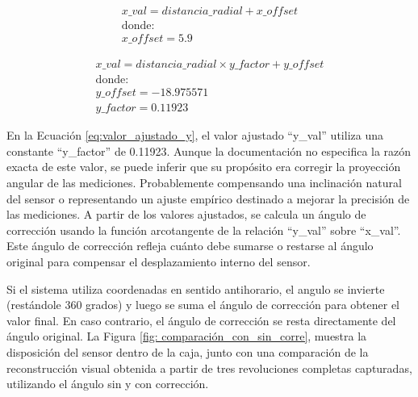 \begin{center}
	\begin{equation}
		\label{eq:valor_ajustado_x}
		\begin{array}{c}
			x\_val = distancia\_radial + x\_offset \\
			\text{donde:} \\
			x\_offset = 5.9
		\end{array}
	\end{equation}
\end{center}

\begin{center}
	\begin{equation}
		\label{eq:valor_ajustado_y}
		\begin{array}{c}
			x\_val = distancia\_radial \times y\_factor + y\_offset \\
			\text{donde:} \\
			y\_offset = -18.975571 \\
			y\_factor = 0.11923
		\end{array}
	\end{equation}
\end{center}

En la Ecuación \ref{eq:valor_ajustado_y}, el valor ajustado ``y\_val'' utiliza una constante  ``y\_factor'' de 0.11923. Aunque la documentación no especifica la razón exacta de este valor, se puede inferir que su propósito era corregir la proyección angular de las mediciones. Probablemente compensando una inclinación natural del sensor o representando un ajuste empírico destinado a mejorar la precisión de las mediciones. A partir de los valores ajustados, se calcula un ángulo de corrección usando la función arcotangente de la relación ``y\_val'' sobre ``x\_val''. Este ángulo de corrección refleja cuánto debe sumarse o restarse al ángulo original para compensar el desplazamiento interno del sensor. 

Si el sistema utiliza coordenadas en sentido antihorario, el angulo se invierte (restándole 360 grados) y luego se suma el ángulo de corrección para obtener el valor final. En caso contrario, el ángulo de corrección se resta directamente del ángulo original. La Figura \ref{fig: comparación_con_sin_corre}, muestra la disposición del sensor dentro de la caja, junto con una comparación de la reconstrucción visual obtenida a partir de tres revoluciones completas capturadas, utilizando el ángulo sin y con corrección.

